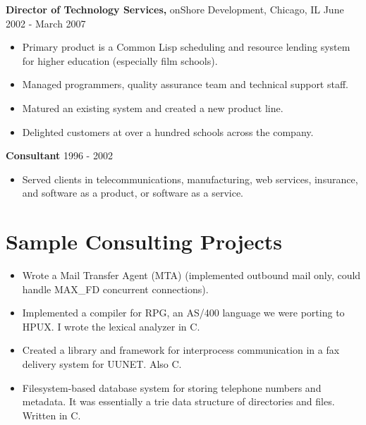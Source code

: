 \documentclass[margin]{res}
\begin{document}
\begin{resume}
{\bf Director of Technology Services,} onShore Development, Chicago, IL \hfill June 2002 - March 2007
\begin{itemize} \itemsep -2pt %
\item Primary product is a Common Lisp scheduling and resource lending system for higher education (especially film schools).
\item Managed programmers, quality assurance team and technical support staff.
\item Matured an existing system and created a new product line.
\item Delighted customers at over a hundred schools across the company.
\end{itemize}

{\bf Consultant} \hfill 1996 - 2002
\begin{itemize} \itemsep -2pt %
\item Served clients in telecommunications, manufacturing, web services, insurance, and software as a product, or software as a service.
\end{itemize}

\section{Sample Consulting Projects}
\begin{itemize} \itemsep -2pt %
\item Wrote a Mail Transfer Agent (MTA) (implemented outbound mail only, could handle MAX\_FD concurrent connections).
\item Implemented a compiler for RPG, an AS/400 language we were porting to HPUX.  I wrote the lexical analyzer in C.
\item Created a library and framework for interprocess communication in a fax delivery system for UUNET. Also C.
\item Filesystem-based database system for storing telephone numbers and metadata.  It was essentially a trie data structure of directories and files.  Written in C.
\end{itemize}
\end{resume}
\end{document}
